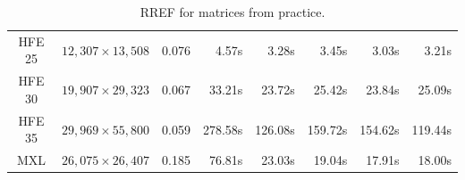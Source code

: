 \begin{table}
\begin{footnotesize}
\begin{center}
\begin{tabular}{|c|c|r|r|r|r|r|r|}
\hline        
 HFE 25 & $12,307 \times 13,508$ &   0.076 &   4.57s &    3.28s &       3.45s &   3.03s &   3.21s\\
 HFE 30 & $19,907 \times 29,323$ &   0.067 &  33.21s &   23.72s &      25.42s &  23.84s &  25.09s\\
 HFE 35 & $29,969 \times 55,800$ &   0.059 & 278.58s &  126.08s &     159.72s & 154.62s & 119.44s\\
 MXL    & $26,075 \times 26,407$ &   0.185 &  76.81s &   23.03s &      19.04s &  17.91s &  18.00s\\
\hline
\end{tabular}
\caption{RREF for matrices from practice.}
\label{tab:pluq-practice}
\end{center}
\end{footnotesize}
\end{table}
